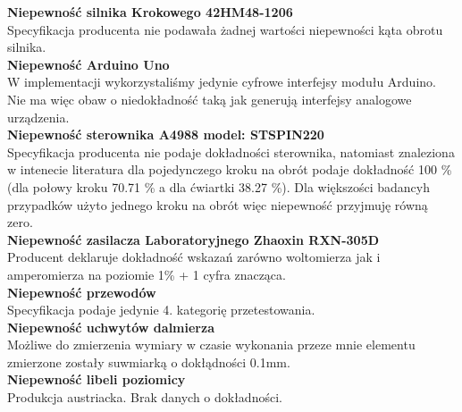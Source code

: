 \textbf{Niepewność silnika Krokowego 42HM48-1206}\\
Specyfikacja producenta nie podawała żadnej wartości niepewności kąta obrotu silnika.\\

\textbf{Niepewność Arduino Uno}\\
W implementacji wykorzystaliśmy jedynie cyfrowe interfejsy modułu Arduino. Nie ma więc obaw o niedokładność taką jak generują interfejsy analogowe urządzenia.\\

\textbf{Niepewność sterownika A4988 model: STSPIN220}\\
Specyfikacja producenta nie podaje dokładności sterownika, natomiast znaleziona w intenecie literatura \cite{microstepping} dla pojedynczego kroku na obrót podaje dokładność 100 \% (dla połowy kroku 70.71 \% a dla ćwiartki 38.27 \%). Dla większości badancyh przypadków użyto jednego kroku na obrót więc niepewność przyjmuję równą zero.\\

\textbf{Niepewność zasilacza Laboratoryjnego Zhaoxin RXN-305D}\\
Producent deklaruje dokładność wskazań zarówno woltomierza jak i amperomierza na poziomie 1\% + 1 cyfra znacząca.\\

\textbf{Niepewność przewodów}\\
Specyfikacja podaje jedynie 4. kategorię przetestowania.\\

\textbf{Niepewność uchwytów dalmierza}\\
Możliwe do zmierzenia wymiary w czasie wykonania przeze mnie elementu zmierzone zostały suwmiarką o dokłądności 0.1mm.\\

\textbf{Niepewność libeli poziomicy}\\
Produkcja austriacka. Brak danych o dokładności.\\